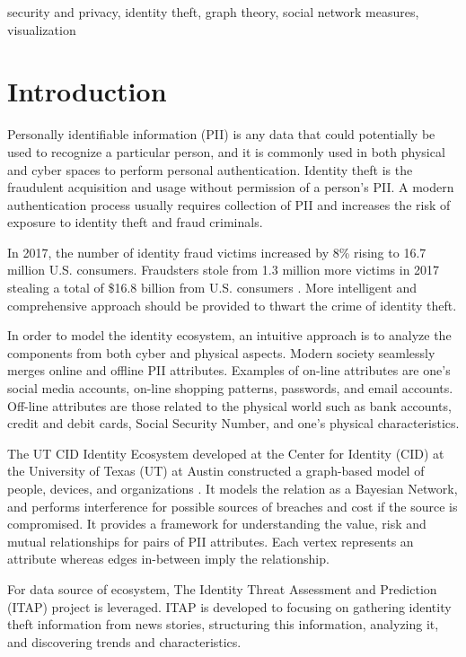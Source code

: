 \documentclass[conference]{IEEEtran}
\begin{document}
\begin{IEEEkeywords}
security and privacy, identity theft, graph theory, social network measures,  visualization
\end{IEEEkeywords}

\section{Introduction}
 Personally identifiable information (PII) is any data that could potentially be used to recognize a particular person, and it is commonly used in both physical and cyber spaces to perform personal authentication. Identity theft is the fraudulent acquisition and usage without permission of a person's PII. A modern authentication process usually requires collection of PII and increases the risk of exposure to identity theft and fraud criminals.

In 2017, the number of identity fraud victims increased by 8\% rising to 16.7 million U.S. consumers. Fraudsters stole from 1.3 million more victims in 2017 stealing a total of \$16.8 billion from U.S. consumers \cite{Pascual}. More intelligent and comprehensive approach should be provided to thwart the crime of identity theft.


In order to model the identity ecosystem, an intuitive  approach is to analyze the components from both cyber and physical aspects. Modern society  seamlessly merges online and offline PII attributes. Examples of on-line attributes are one's social media accounts, on-line shopping patterns, passwords, and email accounts. Off-line attributes are those related to the physical world such as bank accounts, credit and debit cards, Social Security Number, and one's physical characteristics.

 The UT CID Identity Ecosystem developed at the Center for Identity (CID) at the University of Texas (UT) at Austin constructed a graph-based model of people, devices, and organizations \cite{EcosystemModeling}. It models the relation as a Bayesian Network, and performs interference for possible sources of breaches and cost if the source is compromised.
It provides a framework for understanding the value, risk and mutual relationships for pairs of PII attributes. Each vertex represents an attribute whereas edges in-between imply the relationship.

For data source of ecosystem, The Identity Threat Assessment and Prediction (ITAP) \cite{ITAPDataSource} project is leveraged. ITAP is developed to focusing on gathering identity theft information from news stories, structuring this information, analyzing it, and discovering trends and characteristics.
\end{document}
